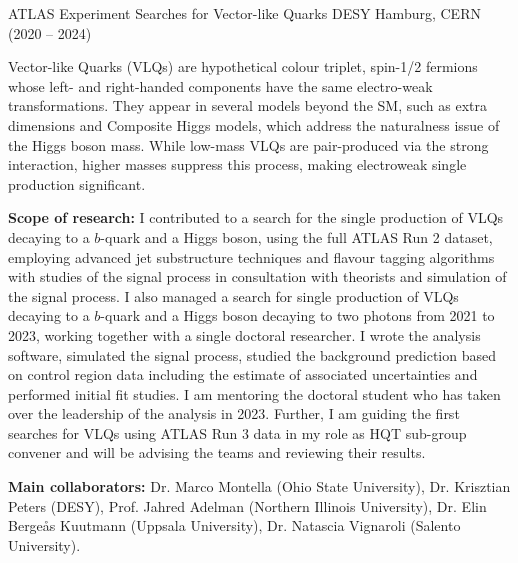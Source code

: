 \begin{cventries}
\cventry
{ATLAS Experiment} %
{Searches for Vector-like Quarks} %
{DESY Hamburg, CERN} %
{(2020 – 2024)} %
{
  \begin{cvitems} %
    \item {Vector-like Quarks (VLQs) are hypothetical colour triplet, spin-1/2 fermions whose left- and right-handed components have the same electro-weak transformations. They appear in several models beyond the SM, such as extra dimensions and Composite Higgs models, which address the
    naturalness issue of the Higgs boson mass. While low-mass VLQs are pair-produced via the strong
    interaction, higher masses suppress this process, making electroweak single production significant.}
    \item \textbf{Scope of research:} I contributed to a search for the single production of VLQs decaying to a \(b\)-quark and a Higgs boson, using the full ATLAS Run 2 dataset, employing advanced jet
    substructure techniques and flavour tagging algorithms with studies of the signal process in
    consultation with theorists and simulation of the signal process. I also managed a search for
    single production of VLQs decaying to a \(b\)-quark and a Higgs boson decaying to two photons
    from 2021 to 2023, working together with a single doctoral researcher. I wrote the analysis
    software, simulated the signal process, studied the background prediction based on control
    region data including the estimate of associated uncertainties and performed initial fit studies. I am mentoring the doctoral student who has taken over the leadership of the analysis in 2023. Further, I am guiding the first searches for VLQs using ATLAS Run 3 data in my role as HQT sub-group convener and will be advising the teams and reviewing their results.
    \item \textbf{Main collaborators:} Dr. Marco Montella (Ohio State University), Dr. Krisztian Peters (DESY), Prof. Jahred Adelman (Northern Illinois University), Dr. Elin Bergeås Kuutmann (Uppsala University), Dr. Natascia Vignaroli (Salento University).
  \end{cvitems}
}



\end{cventries}
